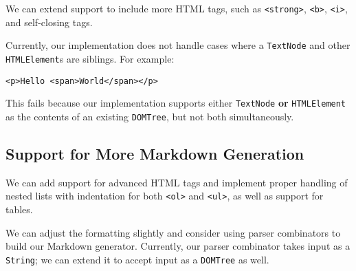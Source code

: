 \documentclass[12pt, a4paper]{article}
\begin{document}
We can extend support to include more HTML tags, such as \texttt{<strong>}, \texttt{<b>}, \texttt{<i>}, and self-closing tags.

Currently, our implementation does not handle cases where a \texttt{TextNode} and other \texttt{HTMLElement}s are siblings. For example:

\begin{verbatim}
<p>Hello <span>World</span></p> 
\end{verbatim}

This fails because our implementation supports either \texttt{TextNode} \textbf{or} \texttt{HTMLElement} as the contents of an existing \texttt{DOMTree}, but not both simultaneously.

\subsection{Support for More Markdown Generation}

We can add support for advanced HTML tags and implement proper handling of nested lists with indentation for both \texttt{<ol>} and \texttt{<ul>}, as well as support for tables.

We can adjust the formatting slightly and consider using parser combinators to build our Markdown generator. Currently, our parser combinator takes input as a \texttt{String}; we can extend it to accept input as a \texttt{DOMTree} as well.


\end{document}
